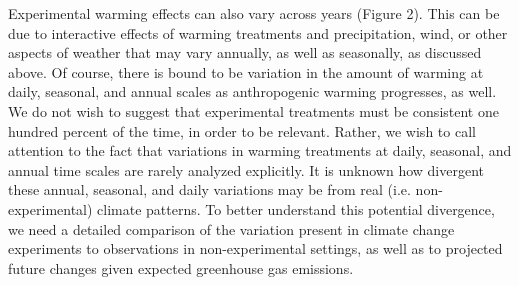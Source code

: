\documentclass{article}
\begin{document}
\par Experimental warming effects can also vary across years  (Figure  2). This  can be due  to interactive effects of warming  treatments and  precipitation, wind, or other aspects of weather  that may  vary  annually, as well as seasonally, as discussed above. Of course, there is bound to be variation in the amount of warming at daily, seasonal, and annual scales as anthropogenic warming progresses, as well. We do not wish to suggest that experimental treatments must be consistent one hundred percent of the time, in order to be relevant. Rather, we wish to call attention to the fact that variations in warming treatments at daily, seasonal, and annual time scales are rarely analyzed explicitly.  It is unknown how divergent these annual, seasonal, and daily variations may be from real (i.e. non-experimental) climate patterns. To better understand this potential divergence, we need a detailed comparison of the variation present in climate change experiments to observations in non-experimental settings, as well as to projected future changes given expected greenhouse gas emissions.  
\end{document}
